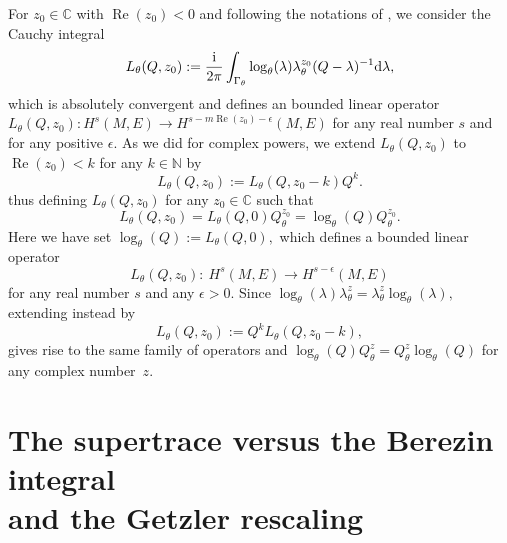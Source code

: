 \documentclass[10pt,a4paper]{amsart}
\numberwithin{equation}{section}
\theoremstyle{definition}
\newcommand{\C}{\mathbb C}
\newcommand{\N}{\mathbb N}
\begin{document}
	For $z_0\in \C$ with $\operatorname{Re}(z_0)< 0$ and following the notations of \cite[formula (2.6.1.6)]{Sc}, we consider the Cauchy integral
	\begin{gather*}
		L_\theta(Q, z_0)
		:=\frac{{\rm i}}{2\pi}\int_{\Gamma_{\theta}} \log _\theta(\lambda) \lambda_\theta^{z_0} (Q-\lambda)^{-1} {\rm d}\lambda,
	\end{gather*}
	which is absolutely convergent and defines an bounded linear operator $ L_\theta(Q, z_0)\colon H^s(M,E)\longrightarrow H^{s-m\operatorname{Re}(z_0)-\epsilon}(M,E)$ for any real number $s$ and for any positive $\epsilon$.
	As we did for complex powers, we extend $ L_\theta(Q, z_0)$ to $\operatorname{Re}(z_0)<k$ for any $k\in \N$ by \cite[formula (2.6.1.7)]{Sc}
	\begin{equation*}	%
		L_\theta(Q, z_0):= L_\theta(Q, z_0-k) Q^k. \end{equation*}
	thus defining $L_\theta(Q, z_0)$ for any $z_0\in \C$ such that
	\[L_\theta(Q, z_0)= L_\theta(Q, 0) Q_\theta^{z_0}= \log_\theta(Q) Q_\theta^{z_0}.\]
Here we have set $\log_\theta(Q):= L_\theta(Q, 0),$ which defines a bounded linear operator
\[
L_\theta(Q, z_0)\colon \ H^s(M,E)\to H^{s -\epsilon}(M,E)
\]
 for any real number $s$ and any $\epsilon>0$. Since $\log_\theta(\lambda) \lambda_\theta^z= \lambda_\theta^z \log_\theta (\lambda),$ extending instead by
	\begin{equation*} L_\theta(Q, z_0):= Q^k L_\theta(Q, z_0-k), \end{equation*} gives rise to the same family of operators and $\log _\theta (Q) Q_\theta^z=Q_\theta^z \log _\theta (Q)$ for any complex number~$z$.

\section[The supertrace versus the Berezin integral and the Getzler rescaling]{The supertrace versus the Berezin integral\\ and the Getzler rescaling} \label{sec:appendix3}
\end{document}
